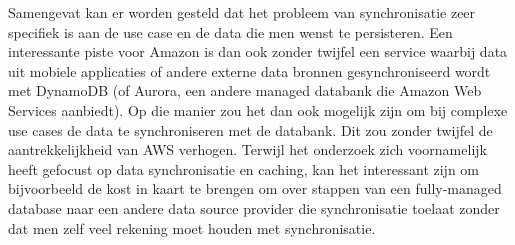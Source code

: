 Samengevat kan er worden gesteld dat het probleem van synchronisatie zeer specifiek is aan de use case en de data die men wenst te persisteren. Een interessante piste voor Amazon is dan ook zonder twijfel een service waarbij data uit mobiele applicaties of andere externe data bronnen gesynchroniseerd wordt met DynamoDB (of Aurora, een andere managed databank die Amazon Web Services aanbiedt). Op die manier zou het dan ook mogelijk zijn om bij complexe use cases de data te synchroniseren met de databank. Dit zou zonder twijfel de aantrekkelijkheid van AWS verhogen. Terwijl het onderzoek zich voornamelijk heeft gefocust op data synchronisatie en caching, kan het interessant zijn om bijvoorbeeld de kost in kaart te brengen om over stappen van een fully-managed database naar een andere data source provider die synchronisatie toelaat zonder dat men zelf veel rekening moet houden met synchronisatie.